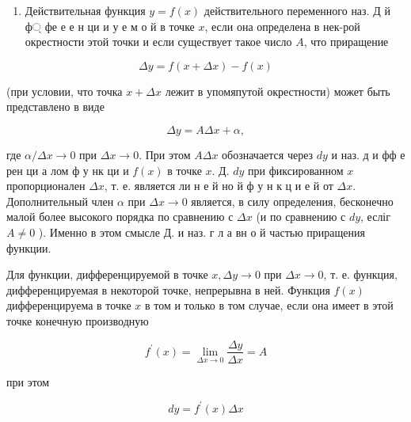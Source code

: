 \documentclass[10pt]{article}
\begin{document}
\begin{enumerate}

  \item Действительная функция $y=f(x)$ действительного переменного наз. Д й ф্ фе е е н ци и у е м о й в точке $x$, если она определена в нек-рой окрестности этой точки и если существует такое число $A$, что приращение

\end{enumerate}



\[

\Delta y=f(x+\Delta x)-f(x)

\]



(при условии, что точка $x+\Delta x$ лежит в упомяпутой окрестности) может быть представлено в виде



\[

\Delta y=A \Delta x+\alpha,

\]



где $\alpha / \Delta x \rightarrow 0$ при $\Delta x \rightarrow 0$. При этом $A \Delta x$ обозначается через $d y$ и наз. д и фф е рен ци а лом ф у нк ци и $f(x)$ в точке $x$. Д. $d y$ при фиксированном $x$ пропорционален $\Delta x$, т. е. является ли н е й но й ф у н к ц и е й от $\Delta x$. Дополнительный член $\alpha$ при $\Delta x \rightarrow 0$ является, в силу определения, бесконечно малой более высокого порядка по сравнению с $\Delta x$ (и по сравнению с $d y$, есліг $A \neq 0$ ). Именно в этом смысле Д. и наз. г л а вн о й частью приращения функции.



Для функции, дифференцируемой в точке $x, \Delta y \rightarrow 0$ при $\Delta x \rightarrow 0$, т. е. функция, дифференцируемая в некоторой точке, непрерывна в ней. Функция $f(x)$ дифференцируема в точке $x$ в том и только в том случае, если она имеет в этой точке конечную производную



\[

f^{\prime}(x)=\lim _{\Delta x \rightarrow 0} \frac{\Delta y}{\Delta x}=A

\]



при этом



\[

d y=f^{\prime}(x) \Delta x

\]
\end{document}

